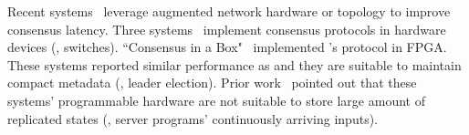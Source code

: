 % 
% 






  Recent
systems~\cite{consensusbox:nsdi16,netpaxos:sosr15,caans,specpaxos:nsdi15,
nopaxos:osdi16} leverage augmented network hardware or topology to 
improve \paxos consensus latency. 
Three systems~\cite{consensusbox:nsdi16,netpaxos:sosr15,caans} implement 
consensus protocols in hardware devices (\eg, switches). ``Consensus in a 
Box"~\cite{consensusbox:nsdi16} implemented \zookeeper's protocol in 
FPGA. These systems reported similar performance as \dare and they are 
suitable to maintain compact metadata (\eg, leader election). Prior 
work~\cite{nopaxos:osdi16} pointed out that these systems' programmable hardware 
are not suitable to store large amount of replicated states (\eg, server 
programs' continuously arriving inputs).

